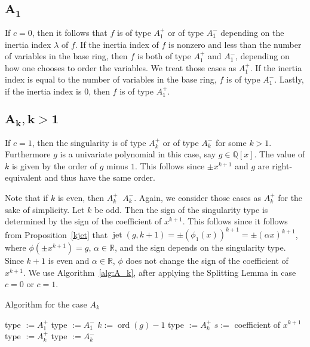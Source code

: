 \documentclass[noend]{amsproc}
\theoremstyle{definition}
\DeclareMathOperator{\ord}{ord}
\DeclareMathOperator{\requiv}{\overset{r}{\sim}}
\DeclareMathOperator{\jet}{jet}
\begin{document}
\subsection{$\boldsymbol{A_1}$}
If $c = 0$, then it follows that $f$ is of type $A_1^+$ or of type $A_1^-$
depending on the inertia index $\lambda$ of $f$. If the inertia index of $f$ is
nonzero and less than the number of variables in the base ring, then $f$ is
both of type $A_1^+$ and $A_1^-$, depending on how one chooses to order the
variables. We treat those cases as $A_1^+$. If the inertia index is equal to
the number of variables in the base ring, $f$ is of type $A_1^-$. Lastly, if
the inertia index is $0$, then $f$ is of type $A_1^+$.

\subsection{$\boldsymbol{A_k, k > 1}$}
If $c=1$, then the singularity is of type $A_k^+$ or of type $A_k^-$ for some
$k>1$. Furthermore $g$ is a univariate polynomial in this case, say
$g\in\mathbb Q[x]$. The value of $k$ is given by the order of $g$ minus $1$.
This follows since $\pm x^{k+1}$ and $g$ are right-equivalent and thus have the
same order.

Note that if $k$ is even, then $A_k^+\requiv A_k^-$. Again, we consider those
cases as $A_k^+$ for the sake of simplicity. Let $k$ be odd. Then the sign of
the singularity type is determined by the sign of the coefficient of $x^{k+1}$.
This follows since it follows from Proposition~\ref{kjet} that
$\jet(g, k+1)=\pm(\phi_1(x))^{k+1}=\pm(\alpha x)^{k+1}$, where
$\phi(\pm x^{k+1})=g$, $\alpha\in\mathbb R$, and the sign depends on the
singularity type. Since $k+1$ is even and $\alpha\in\mathbb R$, $\phi$ does not
change the sign of the coefficient of $x^{k+1}$. We use
Algorithm~\ref{alg:A_k}, after applying the Splitting Lemma in case $c=0$ or
$c=1$.

\begin{algorithm}[ht]
\caption{\label{alg:A_k} Algorithm for the case $A_k$}
\begin{algorithmic}[1]



\State type $:=A_1^+$
\Else
\State type $:=A_1^-$
\EndIf
\EndIf
{}
\State $k:= \ord(g)-1$
\State type $:=A_k^+$
\Else
\State $s:=$ coefficient of $x^{k+1}$
\State type $:=A_k^+$
\Else
\State type $:=A_k^-$
\EndIf
\EndIf
\EndIf
{}

\end{algorithmic}
\end{algorithm}
\end{document}
